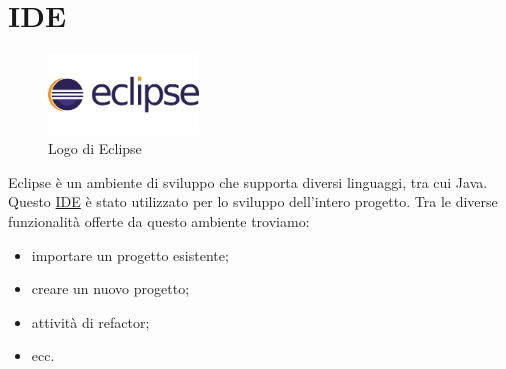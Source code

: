 \section{IDE}

\begin{figure}[!h]
	\centering
	\includegraphics[width=4cm]{../images/Eclipse-logo.png}
	\caption{Logo di Eclipse}
\end{figure}

\noindent Eclipse è un ambiente di sviluppo che supporta diversi linguaggi, tra cui Java. Questo {\hyperref[sec:ide-definition]{IDE}}\glsfirstoccur \; è stato utilizzato per lo sviluppo dell'intero progetto.
Tra le diverse funzionalità offerte da questo ambiente troviamo:
\begin{itemize}
\item importare un progetto esistente;
\item creare un nuovo progetto;
\item attività di refactor;
\item ecc.
\end{itemize}